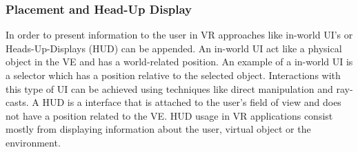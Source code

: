 \subsubsection{Placement and Head-Up Display}
In order to present information to the user in VR approaches like in-world UI's or Heads-Up-Displays (HUD) can be appended. An in-world UI act like a physical object in the VE and has a world-related position. An example of a in-world UI is a selector\label{theory:toolsandtech:selector} which has a position relative to the selected object. Interactions with this type of UI can be achieved using techniques like direct manipulation\label{theory:toolsandtech:direct} and ray-casts\label{theory:toolsandtech:raycast}. A HUD is a interface that is attached to the user's field of view and does not have a position related to the VE. HUD usage in VR applications consist mostly from displaying information about the user, virtual object or the environment\cite{interface:sherman2002understanding}.
